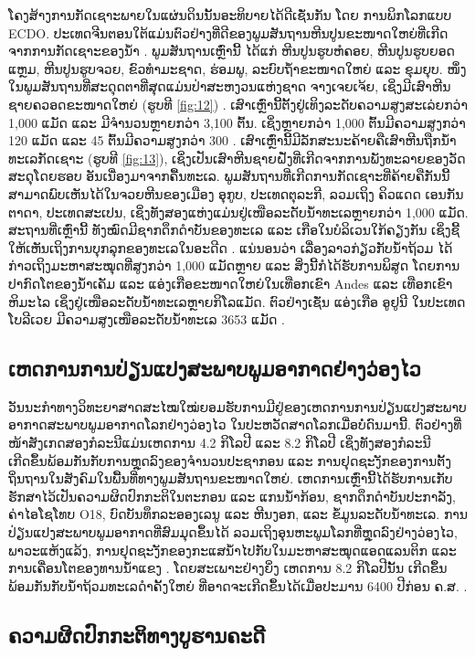 \documentclass[10pt,twocolumn,letterpaper]{article}
\begin{document}
ໂຄງສ້າງການກັດເຊາະພາຍໃນແຜ່ນດິນນັ້ນອະທິບາຍໄດ້ດີເຊັ່ນກັນ ໂດຍ ການພິກໂລກແບບ ECDO. ປະເທດຈີນຕອນໃຕ້ແມ່ນຕົວຢ່າງທີ່ດີຂອງພູມສັນຖານຫີນປູນຂະໜາດໃຫຍ່ທີ່ເກີດຈາກການກັດເຊາະຂອງນ້ຳ \cite{82}. ພູມສັນຖານເຫຼົ່ານີ້ ໄດ້ແກ່ ຫີນປູນຮູບຫໍຄອຍ, ຫີນປູນຮູບຍອດແຫຼມ, ຫີນປູນຮູບຈວຍ, ຂົວທຳມະຊາດ, ຮ່ອມພູ, ລະບົບຖ້ຳຂະໜາດໃຫຍ່ ແລະ ຂຸມຍຸບ. ໜຶ່ງໃນພູມສັນຖານທີ່ສະດຸດຕາທີ່ສຸດແມ່ນປ່າສະຫງວນແຫ່ງຊາດ ຈາງເຈຍເຈ້ຍ, ເຊິ່ງມີເສົາຫີນຊາຍຄວອດຂະໜາດໃຫຍ່ (ຮູບທີ \ref{fig:12}) \cite{84}. ເສົາເຫຼົ່ານີ້ຕັ້ງຢູ່ເທິງລະດັບຄວາມສູງສະເລ່ຍກວ່າ 1,000 ແມັດ ແລະ ມີຈຳນວນຫຼາຍກວ່າ 3,100 ຕົ້ນ. ເຊິ່ງຫຼາຍກວ່າ 1,000 ຕົ້ນມີຄວາມສູງກວ່າ 120 ແມັດ ແລະ 45 ຕົ້ນມີຄວາມສູງກວ່າ 300 \cite{85}. ເສົາເຫຼົ່ານີ້ມີລັກສະນະຄ້າຍຄືເສົາຫີນຖືກນ້ຳທະເລກັດເຊາະ (ຮູບທີ \ref{fig:13}), ເຊິ່ງເປັນເສົາຫີນຊາຍຝັ່ງທີ່ເກີດຈາກການພັງທະລາຍຂອງວັດສະດຸໂດຍຮອບ ອັນເນື່ອງມາຈາກຄື້ນທະເລ. ພູມສັນຖານທີ່ເກີດການກັດເຊາະທີ່ຄ້າຍຄືກັນນີ້ ສາມາດພົບເຫັນໄດ້ໃນຈວຍຫີນຂອງເມືອງ ອຸກູບ, ປະເທດຕຸລະກີ, ລວມເຖິງ ຄິວແດດ ເອນກັນຕາດາ, ປະເທດສະເປນ, ເຊິ່ງທັງສອງແຫ່ງແມ່ນຢູ່ເໜືອລະດັບນ້ຳທະເລຫຼາຍກວ່າ 1,000 ແມັດ. ສະຖານທີ່ເຫຼົ່ານີ້ ທັງໝົດມີຊາກດຶກດຳບັນຂອງທະເລ ແລະ ເກືອໃນບໍລິເວນໃກ້ຄຽງກັນ ເຊິ່ງຊີ້ໃຫ້ເຫັນເຖິງການບຸກລຸກຂອງທະເລໃນອະດີດ \cite{15,86,87}. ແນ່ນອນວ່າ ເລື່ອງລາວກ່ຽວກັບນ້ຳຖ້ວມ \cite{3} ໄດ້ກ່າວເຖິງມະຫາສະໝຸດທີ່ສູງກວ່າ 1,000 ແມັດຫຼາຍ ແລະ ສິ່ງນີ້ກໍໄດ້ຮັບການພິສູດ ໂດຍການປາກົດໂຕຂອງນ້ຳເຄັມ ແລະ ແອ່ງເກືອຂະໜາດໃຫຍ່ໃນເທືອກເຂົາ Andes ແລະ ເທືອກເຂົາຫິມະໄລ ເຊິ່ງຢູ່ເໜືອລະດັບນ້ຳທະເລຫຼາຍກິໂລແມັດ. ຕົວຢ່າງເຊັ່ນ ແອ່ງເກືອ ອູຢູນີ ໃນປະເທດໂບລີເວຍ ມີຄວາມສູງເໜືອລະດັບນ້ຳທະເລ 3653 ແມັດ \cite{94}.

\subsection{ເຫດການການປ່ຽນແປງສະພາບພູມອາກາດຢ່າງວ່ອງໄວ}

ວັນນະກຳທາງວິທະຍາສາດສະໄໝໃໝ່ຍອມຮັບການມີຢູ່ຂອງເຫດການການປ່ຽນແປງສະພາບອາກາດສະພາບພູມອາກາດໂລກຢ່າງວ່ອງໄວ ໃນປະຫວັດສາດໂລກເມື່ອບໍ່ດົນມານີ້. ຕົວຢ່າງທີ່ໜ້າສັງເກດສອງກໍລະນີແມ່ນເຫດການ 4.2 ກິໂລປີ ແລະ 8.2 ກິໂລປີ ເຊິ່ງທັງສອງກໍລະນີເກີດຂຶ້ນພ້ອມກັນກັບການຫຼຸດລົງຂອງຈຳນວນປະຊາກອນ ແລະ ການຢຸດຊະງັກຂອງການຕັ້ງຖິ່ນຖານໃນສັງຄົມໃນພື້ນທີ່ທາງພູມສັນຖານຂະໜາດໃຫຍ່. ເຫດການເຫຼົ່ານີ້ໄດ້ຮັບການເກັບຮັກສາໄວ້ເປັນຄວາມຜິດປົກກະຕິໃນຕະກອນ ແລະ ແກນນ້ຳກ້ອນ, ຊາກດຶກດຳບັນປະກາລັງ, ຄ່າໄອໂຊໂທບ O18, ບົດບັນທຶກລະອອງເລນູ ແລະ ຫີນງອກ, ແລະ ຂໍ້ມູນລະດັບນ້ຳທະເລ. ການປ່ຽນແປງສະພາບພູມອາກາດທີ່ສົມມຸດຂຶ້ນໄດ້ ລວມເຖິງອຸນຫະພູມໂລກທີ່ຫຼຸດລົງຢ່າງວ່ອງໄວ, ພາວະແຫ້ງແລ້ງ, ການຢຸດຊະງັກຂອງກະແສນ້ຳໄປກັບໃນມະຫາສະໝຸດແອດແລນຕິກ ແລະ ການເຄື່ອນໂຕຂອງທານນ້ຳແຂງ \cite{90,91,92}. ໂດຍສະເພາະຢ່າງຍິ່ງ ເຫດການ 8.2 ກິໂລປີນັ້ນ ເກີດຂຶ້ນພ້ອມກັນກັບນ້ຳຖ້ວມທະເລດຳຄັ້ງໃຫຍ່ ທີ່ອາດຈະເກີດຂຶ້ນໄດ້ເມື່ອປະມານ 6400 ປີກ່ອນ ຄ.ສ. \cite{93}.

\subsection{ຄວາມຜິດປົກກະຕິທາງບູຮານຄະດີ}
\end{document}
